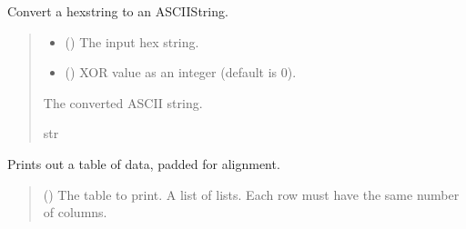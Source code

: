\documentclass[letterpaper,10pt,english]{sphinxmanual}
\begin{document}

\begin{fulllineitems}
\label{\detokenize{apidocs:management.hexstring2ascii}}
\pysigstartsignatures
{}
\pysigstopsignatures
\sphinxAtStartPar
Convert a hexstring to an ASCII\sphinxhyphen{}String.
\begin{quote}\begin{description}
\begin{itemize}
\item {} 
\sphinxAtStartPar
{} () \textendash{} The input hex string.

\item {} 
\sphinxAtStartPar
{} () \textendash{} XOR value as an integer (default is 0).

\end{itemize}

\sphinxAtStartPar
The converted ASCII string.

\sphinxAtStartPar
str

\end{description}\end{quote}

\end{fulllineitems}


\begin{fulllineitems}
\label{\detokenize{apidocs:management.pprint_table}}
\pysigstartsignatures
{}
\pysigstopsignatures
\sphinxAtStartPar
Prints out a table of data, padded for alignment.
\begin{quote}\begin{description}
\sphinxAtStartPar
{} () \textendash{} The table to print. A list of lists.
Each row must have the same number of columns.

\end{description}\end{quote}

\end{fulllineitems}
\end{document}
